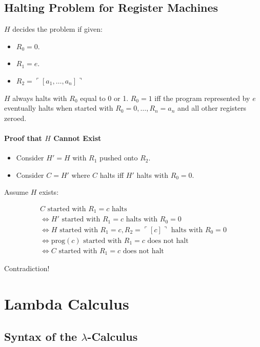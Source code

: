 \documentclass[twocolumn,english]{article}
\begin{document}
\subsection{Halting Problem for Register Machines}

$H$ decides the problem if given: 
\begin{itemize}
\item $R_{0}=0$. 
\item $R_{1}=e$. 
\item $R_{2}=\ulcorner\left[a_{1},\dots,a_{n}\right]\urcorner$ 
\end{itemize}
$H$ always halts with $R_{0}$ equal to 0 or 1. $R_{0}=1$ iff the
program represented by $e$ eventually halts when started with $R_{0}=0,\dots,R_{n}=a_{n}$
and all other registers zeroed.


\paragraph{Proof that $H$ Cannot Exist}
\begin{itemize}
\item Consider $H'=H$ with $R_{1}$ pushed onto $R_{2}$. 
\item Consider $C=H'$ where $C$ halts iff $H'$ halts with $R_{0}=0$. 
\end{itemize}
Assume $H$ exists:

\begin{multline*}
C\text{ started with }R_{1}=c\text{ halts}\\
\iff H'\text{ started with }R_{1}=c\text{ halts with }R_{0}=0\\
\iff H\text{ started with }R_{1}=c,R_{2}=\ulcorner\left[c\right]\urcorner\text{ halts with }R_{0}=0\\
\iff\text{prog}\left(c\right)\text{ started with }R_{1}=c\text{ does not halt}\\
\iff C\text{ started with }R_{1}=c\text{ does not halt}
\end{multline*}


Contradiction!


\section{Lambda Calculus}


\subsection{Syntax of the $\lambda$-Calculus}
\end{document}
